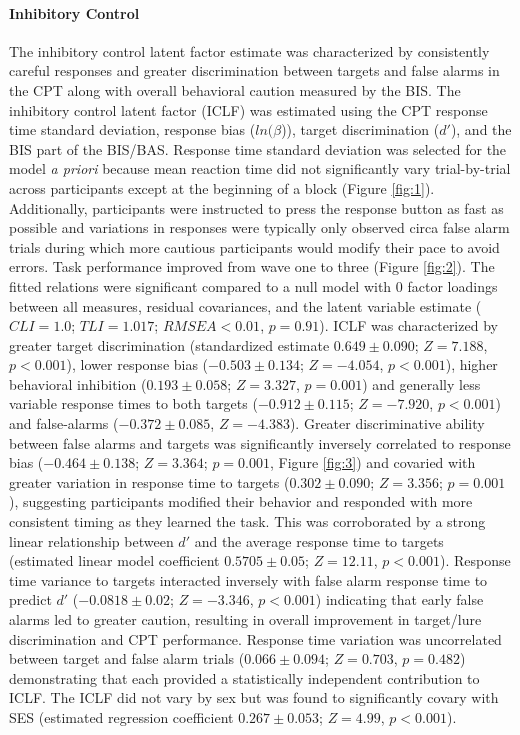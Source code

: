 \documentclass[utf8]{frontiersSCNS} %
\begin{document}
\paragraph{Inhibitory Control} The inhibitory control latent factor estimate was characterized by consistently careful responses and greater discrimination between targets and false alarms in the CPT along with overall behavioral caution measured by the BIS. The inhibitory control latent factor (ICLF) was estimated using the CPT response time standard deviation, response bias ($ln(\beta$)), target discrimination ($d'$), and the BIS part of the BIS/BAS. Response time standard deviation was selected for the model \textit{a priori} because mean reaction time did not significantly vary trial-by-trial across participants except at the beginning of a block (Figure \ref{fig:1}). Additionally, participants were instructed to press the response button as fast as possible and variations in responses were typically only observed circa false alarm trials during which more cautious participants would modify their pace to avoid errors. Task performance improved from wave one to three (Figure \ref{fig:2}). The fitted relations were significant compared to a null model with 0 factor loadings between all measures, residual covariances, and the latent variable estimate ($CLI = 1.0$; $TLI = 1.017$; $RMSEA < 0.01$, $p = 0.91$). ICLF was characterized by greater target discrimination (standardized estimate $0.649\pm0.090$; $Z = 7.188$, $p<0.001$), lower response bias ($-0.503\pm0.134$; $Z=-4.054$, $p<0.001$), higher behavioral inhibition ($0.193\pm0.058$; $Z=3.327$, $p=0.001$) and generally less variable response times to both targets ($-0.912\pm0.115$; $Z=-7.920$, $p<0.001$) and false-alarms ($-0.372\pm0.085$, $Z=-4.383$). Greater discriminative ability between false alarms and targets was significantly inversely correlated to response bias ($-0.464\pm0.138$; $Z=3.364$; $p=0.001$, Figure \ref{fig:3}) and covaried with greater variation in response time to targets ($0.302\pm0.090$; $Z=3.356$; $p=0.001$), suggesting participants modified their behavior and responded with more consistent timing as they learned the task. This was corroborated by a strong linear relationship between $d'$ and the average response time to targets (estimated linear model coefficient $0.5705\pm0.05$; $Z=12.11$, $p<0.001$). Response time variance to targets interacted inversely with false alarm response time to predict $d'$ ($-0.0818\pm0.02$;  $Z=-3.346$, $p < 0.001$) indicating that early false alarms led to greater caution, resulting in overall improvement in target/lure discrimination and CPT performance. Response time variation was uncorrelated between target and false alarm trials ($0.066\pm0.094$; $Z=0.703$, $p=0.482$) demonstrating that each provided a statistically independent contribution to ICLF. The ICLF did not vary by sex but was found to significantly covary with SES (estimated regression coefficient $0.267\pm0.053$; $Z=4.99$, $p<0.001$). 
\end{document}
